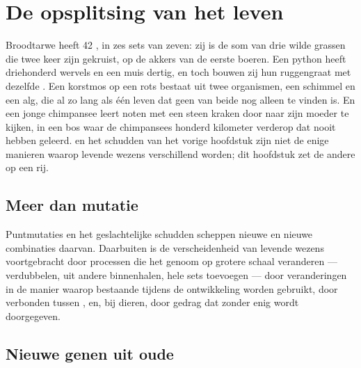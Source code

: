 \chapter{De opsplitsing van het leven}\label{ch:g12:diversification-of-life}

Broodtarwe heeft 42 , in zes sets van zeven: zij is de som van
drie wilde grassen die twee keer zijn gekruist, op de akkers van de
eerste boeren. Een python heeft driehonderd wervels en een muis dertig,
en toch bouwen zij hun ruggengraat met dezelfde . Een korstmos op een
rots bestaat uit twee organismen, een schimmel en een alg, die al zo lang
als één leven dat geen van beide nog alleen te vinden is. En een jonge
chimpansee leert noten met een steen kraken door naar zijn moeder te
kijken, in een bos waar de chimpansees honderd kilometer verderop dat
nooit hebben geleerd.  en het schudden van het vorige hoofdstuk
zijn niet de enige manieren waarop levende wezens verschillend worden;
dit hoofdstuk zet de andere op een rij.

\section{Meer dan mutatie}

\begin{proposition}\label{prop:g12:diversification-of-life:sources}
Puntmutaties en het geslachtelijke schudden scheppen nieuwe  en
nieuwe combinaties daarvan. Daarbuiten is de verscheidenheid van levende
wezens voortgebracht door processen die het genoom op grotere schaal
veranderen ---  verdubbelen,  uit andere  binnenhalen,
hele sets  toevoegen --- door veranderingen in de manier
waarop bestaande  tijdens de ontwikkeling worden gebruikt, door
verbonden tussen , en, bij dieren, door gedrag dat zonder enig 
wordt doorgegeven.
\end{proposition}
\admitted

\section{Nieuwe genen uit oude}

